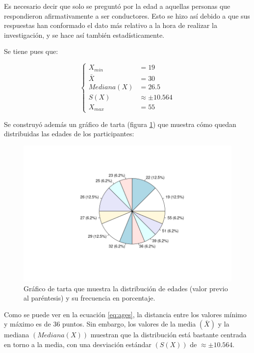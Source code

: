 Es necesario decir que solo se preguntó por la edad a aquellas personas que respondieron
afirmativamente a ser conductores. Esto se hizo así debido a que sus respuestas han
conformado el dato más relativo a la hora de realizar la investigación, y se hace así
también estadísticamente.

Se tiene pues que:

\begin{equation}\label{eq:ages}
  \left\{\begin{aligned}
    X_{min}               & = 19               \\
    \bar{X}               & = 30               \\
    Mediana\left(X\right) & = 26.5             \\
    S\left(X\right)       & \approx \pm 10.564 \\
    X_{max}               & = 55
  \end{aligned}\right.
\end{equation}

Se construyó además un gráfico de tarta (figura \ref{fig:ages}) que muestra cómo
quedan distribuidas las edades de los participantes:

\begin{figure}[H]
  \centering
  \includegraphics[width=\linewidth]{images/ages-pie.png}
  \caption{Gráfico de tarta que muestra la distribución de edades (valor previo al paréntesis) y su frecuencia en porcentaje.}
  \label{fig:ages}
\end{figure}

Como se puede ver en la ecuación \ref{eq:ages}, la distancia entre los valores
mínimo y máximo es de $36$ puntos. Sin embargo, los valores de la media $\left(\bar{X}\right)$
y la mediana $\left(Mediana\left(X\right)\right)$ muestran que la distribución está
bastante centrada en torno a la media, con una desviación estándar $\left(S\left(X\right)\right)$
de $\approx\pm10.564$.

